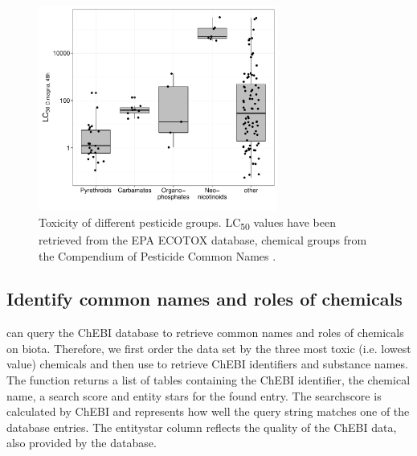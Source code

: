 \documentclass[article]{jss}
\begin{document}
\begin{figure}[t!]
  \centering
  \includegraphics[width=0.7\textwidth, trim = 0 10 0 5, clip]{plot_lc50-1} 
\caption{Toxicity of different pesticide groups. LC\textsubscript{50}
  values have been retrieved from the EPA ECOTOX database, chemical groups
  from the Compendium of Pesticide Common Names \citep{wood}.}
\label{fig:fig2}
\end{figure}

\subsection[Identify common names and roles of chemicals]{Identify common names and roles of chemicals}
 can query the ChEBI database \citep{chebi} to retrieve common names and roles of chemicals on biota. Therefore, we first order the  data set by the three most toxic (i.e. lowest value) chemicals and then use  to retrieve ChEBI identifiers and substance names. The function returns a list of tables containing the ChEBI identifier, the chemical name, a search score and entity stars for the found entry. The searchscore is calculated by ChEBI and represents how well the query string matches one of the database entries. The entitystar column reflects the quality of the ChEBI data, also provided by the database.

\begin{CodeChunk}
\end{CodeChunk}
\end{document}
